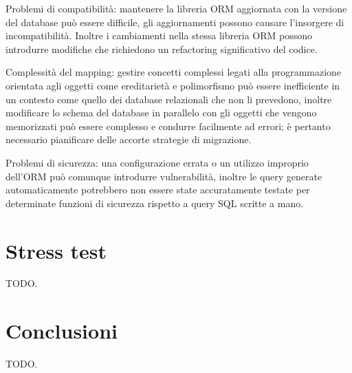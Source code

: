 Problemi di compatibilità: mantenere la libreria ORM aggiornata con la versione del database può essere difficile, gli aggiornamenti possono causare l'insorgere di incompatibilità. Inoltre i cambiamenti nella stessa libreria ORM possono introdurre modifiche che richiedono un refactoring significativo del codice.

Complessità del mapping: gestire concetti complessi legati alla programmazione orientata agli oggetti come ereditarietà e polimorfismo può essere inefficiente in un contesto come quello dei database relazionali che non li prevedono, inoltre modificare lo schema del database in parallelo con gli oggetti che vengono memorizzati può essere complesso e condurre facilmente ad errori; è pertanto necessario pianificare delle accorte strategie di migrazione.

Problemi di sicurezza: una configurazione errata o un utilizzo improprio dell'ORM può comunque introdurre vulnerabilità, inoltre le query generate automaticamente potrebbero non essere state accuratamente testate per determinate funzioni di sicurezza rispetto a query SQL scritte a mano.
\section{Stress test}

TODO.

\section{Conclusioni}

TODO.